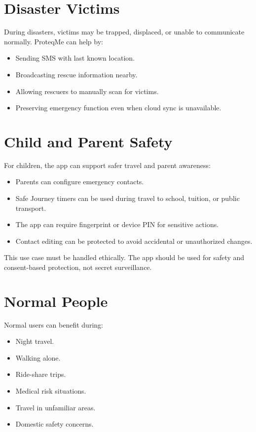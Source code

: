 \documentclass[12pt,a4paper]{report}
\newcommand{\projectname}{ProteqMe}
\begin{document}
\section{Disaster Victims}

During disasters, victims may be trapped, displaced, or unable to communicate normally. \projectname{} can help by:

\begin{itemize}
    \item Sending SMS with last known location.
    \item Broadcasting rescue information nearby.
    \item Allowing rescuers to manually scan for victims.
    \item Preserving emergency function even when cloud sync is unavailable.
\end{itemize}

\section{Child and Parent Safety}

For children, the app can support safer travel and parent awareness:

\begin{itemize}
    \item Parents can configure emergency contacts.
    \item Safe Journey timers can be used during travel to school, tuition, or public transport.
    \item The app can require fingerprint or device PIN for sensitive actions.
    \item Contact editing can be protected to avoid accidental or unauthorized changes.
\end{itemize}

This use case must be handled ethically. The app should be used for safety and consent-based protection, not secret surveillance.

\section{Normal People}

Normal users can benefit during:

\begin{itemize}
    \item Night travel.
    \item Walking alone.
    \item Ride-share trips.
    \item Medical risk situations.
    \item Travel in unfamiliar areas.
    \item Domestic safety concerns.
\end{itemize}
\end{document}
